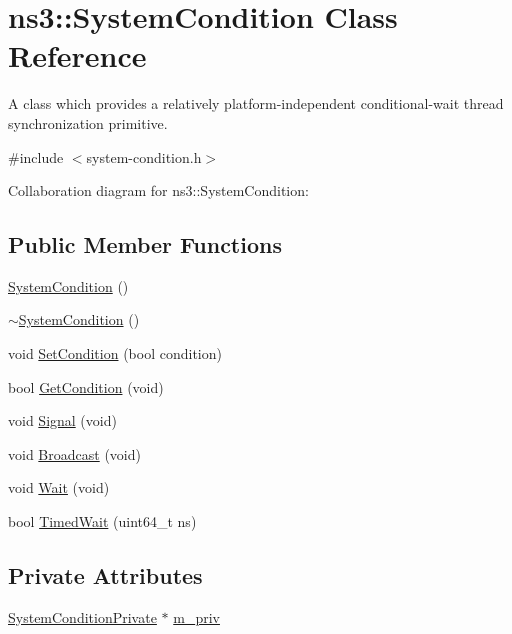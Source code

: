 \hypertarget{classns3_1_1SystemCondition}{}\section{ns3\+:\+:System\+Condition Class Reference}
\label{classns3_1_1SystemCondition}


A class which provides a relatively platform-\/independent conditional-\/wait thread synchronization primitive.  




{\ttfamily \#include $<$system-\/condition.\+h$>$}



Collaboration diagram for ns3\+:\+:System\+Condition\+:
\subsection*{Public Member Functions}
\begin{DoxyCompactItemize}
\item 
\hyperlink{classns3_1_1SystemCondition_af72c4261f575e792a63aa3158cda49cc}{System\+Condition} ()
\item 
\hyperlink{classns3_1_1SystemCondition_aedd031718ff818e54254c5a3c1408076}{$\sim$\+System\+Condition} ()
\item 
void \hyperlink{classns3_1_1SystemCondition_a63be545fd067843934460a375a48e2f3}{Set\+Condition} (bool condition)
\item 
bool \hyperlink{classns3_1_1SystemCondition_a4b6665089213af3531f8903373947239}{Get\+Condition} (void)
\item 
void \hyperlink{classns3_1_1SystemCondition_a40465be65c11db720833a17787652454}{Signal} (void)
\item 
void \hyperlink{classns3_1_1SystemCondition_a9857d6418cd7ce654818c48f479fc652}{Broadcast} (void)
\item 
void \hyperlink{classns3_1_1SystemCondition_acbeea6bc6a31a1bcf03ac562a04f0ab6}{Wait} (void)
\item 
bool \hyperlink{classns3_1_1SystemCondition_af86d685047fcc5e68d36d6a3b033b626}{Timed\+Wait} (uint64\+\_\+t ns)
\end{DoxyCompactItemize}
\subsection*{Private Attributes}
\begin{DoxyCompactItemize}
\item 
\hyperlink{classns3_1_1SystemConditionPrivate}{System\+Condition\+Private} $\ast$ \hyperlink{classns3_1_1SystemCondition_abedcdf182d9c7b51958191d18d61f295}{m\+\_\+priv}
\end{DoxyCompactItemize}


